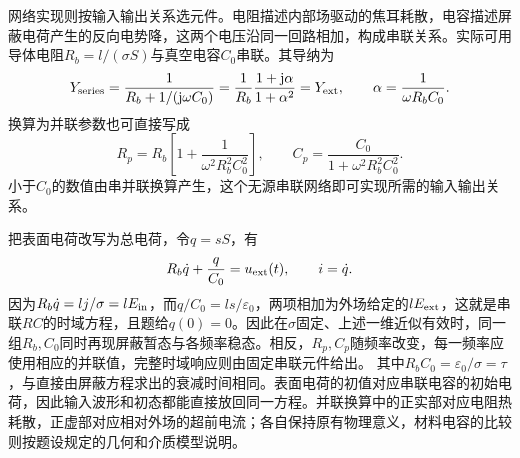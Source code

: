 \documentclass[UTF8,fontset=fandol,a4paper,11pt]{ctexart}
\begin{document}
网络实现则按输入输出关系选元件。电阻描述内部场驱动的焦耳耗散，电容描述屏蔽电荷产生的反向电势降，这两个电压沿同一回路相加，构成串联关系。实际可用导体电阻$R_b=l/(\sigma S)$与真空电容$C_0$串联。其导纳为
\[
Y_{\rm series}=\frac1{R_b+1/(\mathrm j\omega C_0)}
=\frac1{R_b}\frac{1+\mathrm j\alpha}{1+\alpha^2}
=Y_{\rm ext},
\qquad \alpha=\frac1{\omega R_bC_0}.
\]
换算为并联参数也可直接写成
\[
R_p=R_b\left[1+\frac1{\omega^2R_b^2C_0^2}\right],
\qquad
C_p=\frac{C_0}{1+\omega^2R_b^2C_0^2}.
\]
小于$C_0$的数值由串并联换算产生，这个无源串联网络即可实现所需的输入输出关系。

把表面电荷改写为总电荷，令$q=sS$，有
\[
R_b\dot q+\frac q{C_0}=u_{\rm ext}(t),\qquad i=\dot q.
\]
因为$R_b\dot q=l j/\sigma=lE_{\rm in}$，而$q/C_0=l s/\varepsilon_0$，两项相加为外场给定的$lE_{\rm ext}$，这就是串联$RC$的时域方程，且题给$q(0)=0$。因此在$\sigma$固定、上述一维近似有效时，同一组$R_b,C_0$同时再现屏蔽暂态与各频率稳态。相反，$R_p,C_p$随频率改变，每一频率应使用相应的并联值，完整时域响应则由固定串联元件给出。
其中$R_bC_0=\varepsilon_0/\sigma=\tau$，与直接由屏蔽方程求出的衰减时间相同。表面电荷的初值对应串联电容的初始电荷，因此输入波形和初态都能直接放回同一方程。并联换算中的正实部对应电阻热耗散，正虚部对应相对外场的超前电流；各自保持原有物理意义，材料电容的比较则按题设规定的几何和介质模型说明。
\end{document}
